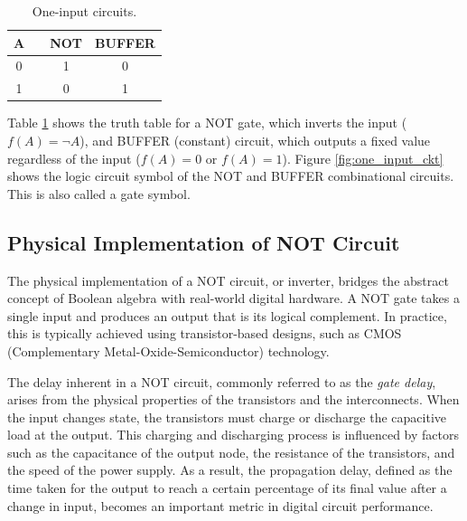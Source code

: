 \begin{table}[H]
  \begin{center}
    \caption{One-input circuits.}
    \label{tab:one_input_circuits}
    \begin{tabular}{|c||c|c|c|}
      \hline
      A&  &  NOT&  BUFFER      \\ \hline \hline
      0&  &   1&       0    \\ \hline
      1&  &   0&       1    \\ \hline
    \end{tabular}
  \end{center}
\end{table}


Table \ref{tab:one_input_circuits} shows the truth table for a NOT gate, which inverts the input (\( f(A) = \neg A \)), and BUFFER (constant) circuit, which outputs a fixed value regardless of the input (\( f(A) = 0 \) or \( f(A) = 1 \)). Figure \ref{fig:one_input_ckt} shows the logic circuit symbol of the NOT and BUFFER combinational circuits. This is also called a gate symbol.

\subsection{Physical Implementation of NOT Circuit}
The physical implementation of a NOT circuit, or inverter, bridges the abstract concept of Boolean algebra with real-world digital hardware. A NOT gate takes a single input and produces an output that is its logical complement. In practice, this is typically achieved using transistor-based designs, such as CMOS (Complementary Metal-Oxide-Semiconductor) technology. 

The delay inherent in a NOT circuit, commonly referred to as the \emph{gate delay}, arises from the physical properties of the transistors and the interconnects. When the input changes state, the transistors must charge or discharge the capacitive load at the output. This charging and discharging process is influenced by factors such as the capacitance of the output node, the resistance of the transistors, and the speed of the power supply. As a result, the propagation delay, defined as the time taken for the output to reach a certain percentage of its final value after a change in input, becomes an important metric in digital circuit performance. 

